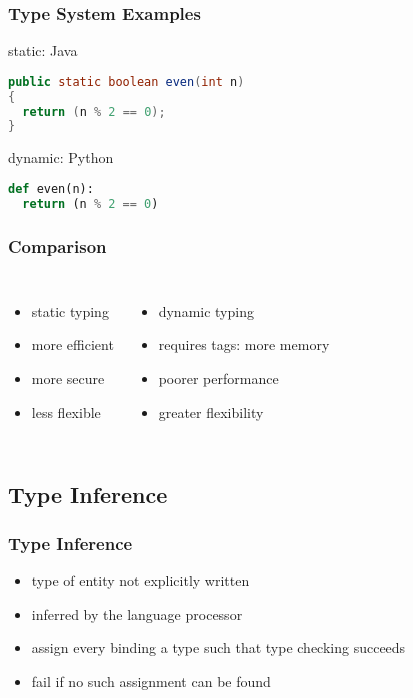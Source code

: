 \documentclass[dvipsnames]{beamer}
\theoremstyle{plain}
\begin{document}
\begin{frame}[fragile]
  \frametitle{Type System Examples}

  \begin{exampleblock}{static: Java}
    \begin{lstlisting}[language=Java]
public static boolean even(int n)
{
  return (n % 2 == 0);
}
    \end{lstlisting}
  \end{exampleblock}

  \begin{exampleblock}{dynamic: Python}
    \begin{lstlisting}[language=Python]
def even(n):
  return (n % 2 == 0)
    \end{lstlisting}
  \end{exampleblock}
\end{frame}

\begin{frame}
  \frametitle{Comparison}

  \begin{columns}[t]
    \begin{itemize}
      \item static typing
      \smallskip
      \item more efficient
      \item more secure
      \item less flexible
    \end{itemize}

    \begin{itemize}
      \item dynamic typing
      \smallskip
      \item requires tags: more memory
      \item poorer performance
      \item greater flexibility
    \end{itemize}
  \end{columns}
\end{frame}

\subsection{Type Inference}

\begin{frame}
  \frametitle{Type Inference}

  \begin{itemize}
    \item type of entity not explicitly written
    \item inferred by the language processor

    \medskip
    \item assign every binding a type such that type checking succeeds
    \item fail if no such assignment can be found
  \end{itemize}
\end{frame}
\end{document}
